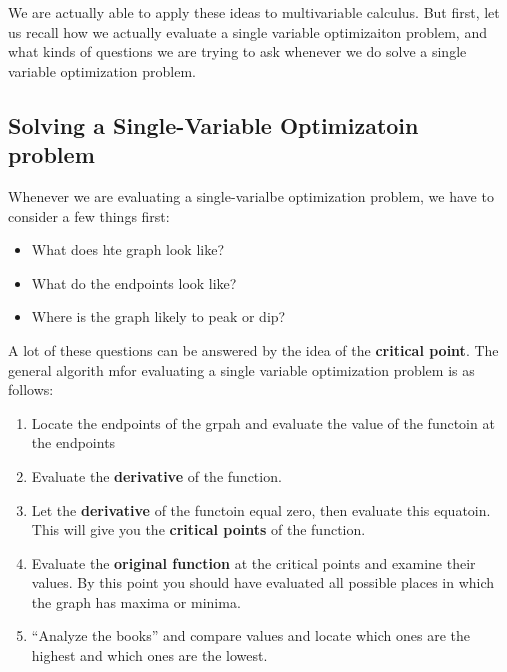 \documentclass{report}
\begin{document}
\begin{sloppypar}
We are actually able to apply these ideas to multivariable calculus. But first, let us recall
how we actually evaluate a single variable
optimizaiton problem, and what kinds of questions
we are trying to ask whenever we do solve a
single variable optimization problem.

\subsection{Solving a Single-Variable Optimizatoin
  problem}
Whenever we are evaluating a single-varialbe
optimization problem, we have to consider a
few things first:
\begin{itemize}
  \item What does hte graph look like?
  \item What do the endpoints look like?
  \item Where is the graph likely to peak or
        dip?
\end{itemize}
A lot of these questions can be answered by
the idea of the \textbf{critical point}.
The general algorith mfor evaluating a single variable
optimization problem is as follows:
\begin{enumerate}
  \item Locate the endpoints of the grpah and
        evaluate the value of the functoin at the
        endpoints
  \item Evaluate the \textbf{derivative} of the
        function.
  \item Let the \textbf{derivative} of the functoin
        equal zero, then evaluate this equatoin. This
        will give you the \textbf{critical points} of
        the function.
  \item Evaluate the \textbf{original function}
        at the critical points and examine their values. By this point you should have
        evaluated all possible places in which
        the graph has maxima or minima.
  \item ``Analyze the books'' and compare
        values and locate which ones are the highest
        and which ones are the lowest.

\end{enumerate}


\end{sloppypar}
\end{document}
